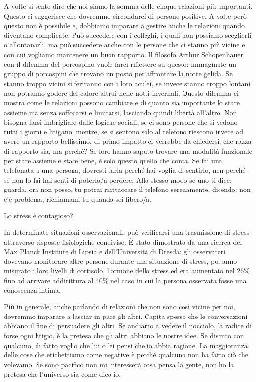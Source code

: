 \documentclass[12pt]{book} %
\begin{document}
A volte si sente dire che noi siamo la somma delle cinque relazioni più importanti. Questo ci suggerisce che dovremmo
circondarci di persone positive. A volte però questo non è possibile e, dobbiamo imparare a gestire anche le relazioni
quando diventano complicate. Può succedere con i colleghi, i quali non possiamo sceglierli o allontanarli, ma può
succedere anche con le persone che ci stanno più vicine e con cui vogliamo mantenere un buon rapporto. Il filosofo
Arthur Schopenhauer con il dilemma del porcospino vuole farci riflettere su questo: immaginate un gruppo di porcospini
che trovano un posto per affrontare la notte gelida. Se stanno troppo vicini si feriranno con i loro aculei, se invece
stanno troppo lontani non potranno godere del calore altrui nelle notti invernali. Questo dilemma ci mostra come le
relazioni possono cambiare e di quanto sia importante lo stare assieme ma senza soffocarsi e limitarsi, lasciando
quindi libertà all'altro. Non bisogna farsi imbrigliare dalle logiche sociali, se ci sono persone
che si vedono tutti i giorni e litigano, mentre, se si sentono solo al telefono riescono invece ad avere un rapporto
bellissimo, di primo impatto ci verrebbe da chiedersi, che razza di rapporto sia, ma perché? Se loro hanno saputo
trovare una modalità funzionale per stare assieme e stare bene, è solo questo quello che conta. Se fai una telefonata a
una persona, dovresti farla perché hai voglia di sentirlo, non perché se non lo fai hai senti di poterlo/a perdere.
Allo stesso modo se uno ti dice: guarda, ora non posso, tu potrai riattaccare il telefono serenamente, dicendo: non c'è
problema, richiamami tu quando sei libero/a.

\begin{mdframed}[linewidth=1pt]
Lo stress è contagioso?

In determinate situazioni osservazionali, può verificarsi una trasmissione di stress attraverso risposte fisiologiche condivise. È stato dimostrato da una ricerca del Max Planck Institute di Lipsia e dell'Università di
Dresda: gli osservatori dovevano monitorare altre persone durante una situazione di stress, poi anno misurato i loro livelli
di cortisolo, l'ormone dello stress ed era aumentato nel 26\% fino ad arrivare addirittura al 40\% nel caso in cui la
persona osservata fosse una conoscenza intima.
\end{mdframed}

Più in generale, anche parlando di relazioni che non sono così vicine per noi, dovremmo imparare a lasciar in pace gli
altri. Capita spesso che le conversazioni abbiano il fine di persuadere gli altri. Se andiamo a vedere il nocciolo, la radice di forse ogni litigio, è la pretesa che gli altri abbiano le nostre idee.
Se discuto con qualcuno, di fatto voglio che lui o lei pensi che io abbia ragione.
La maggioranza delle cose che etichettiamo come negative è perché qualcuno non ha fatto ciò che volevamo. Se sono pacifico non mi interesserà cosa pensa la gente, non ho la pretesa che l'universo sia come dico io.
\end{document}
